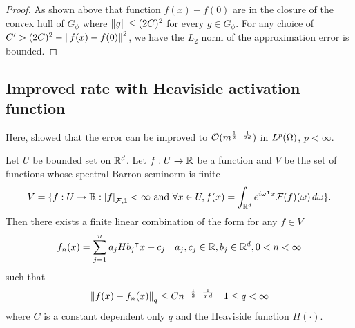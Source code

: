 \begin{proof}
    As shown above that function $f(x) - f(0)$ are in the closure of the convex
    hull of $G_{\phi}$ where $\left\| g \right\| \leq (2C)^2$ for every $g \in G_{\phi}$.
    For any choice of $C' > (2C)^2 - \left\| f(x) - f(0) \right\|^2$, we have the $L_2$
    norm of the approximation error is bounded.




\end{proof}



\subsection{Improved rate with Heaviside activation function}
\label{subsec:improved_heaviside}


Here, \cite{makovozRandomApproximantsNeural1996} showed that the error can be
improved to $\mathcal{O}(m^{\frac{1}{2} - \frac{1}{2d}})$ in $L^{p}(\Omega)$, $p <
\infty$.

\begin{theorem}\cite[Theorem 3]{makovozRandomApproximantsNeural1996}
    \label{thm:improve_barron}

    \TODO

    Let $U$ be bounded set on $\mathbb{R}^d$. Let $f: U \to \mathbb{R}$ be a function and $V$ be
    the set of functions whose spectral Barron seminorm is finite
    \begin{equation}
        V =\{f: U\to\mathbb{R} : \left| f \right|_{\mathcal{F}, {1}} < \infty \text{ and } 
        \forall x\in U,
        f(x) = \int_{\mathbb{R}^d} e^{i\omega{}^{\intercal} x}\mathcal{F}(f)(\omega)\,d\omega\}.
    \end{equation}
    Then there exists a finite linear combination of the form for any $f \in V$
    \begin{equation}
        f_n(x) = \sum_{j=1}^n a_j H{b_j{}^{\intercal} x + c_j} \quad 
            a_j, c_j \in \mathbb{R}, b_j \in \mathbb{R}^d, 0 < n < \infty 
    \end{equation}
    such that 
    \begin{equation}
        \left\| f(x) - f_n(x) \right\|_{q} \leq C n^{-\frac{1}{2} - \frac{1}{q \cdot d}}
        \quad 1 \leq q < \infty
    \end{equation}
    where $C$ is a constant dependent only $q$ and the Heaviside function
    $H(\cdot)$.
\end{theorem}

